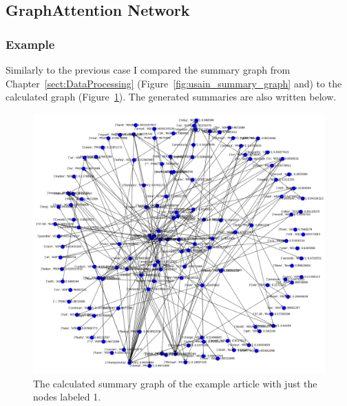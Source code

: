 \subsection{GraphAttention Network}
\subsubsection{Example}
Similarly to the previous case I compared the summary graph from Chapter~\ref{sect:DataProcessing} (Figure~\ref{fig:usain_summary_graph} and) to the calculated graph (Figure~\ref{fig:usain_bolt_predicted1}). The generated summaries are also written below.

\begin{figure}[!ht]
	\centering
	\includegraphics[width=150mm, keepaspectratio]{figures/usain_bolt_predicted_attended.png}
	\caption{The calculated summary graph of the example article with just the nodes labeled 1.}
	\label{fig:usain_bolt_predicted1}
\end{figure}

